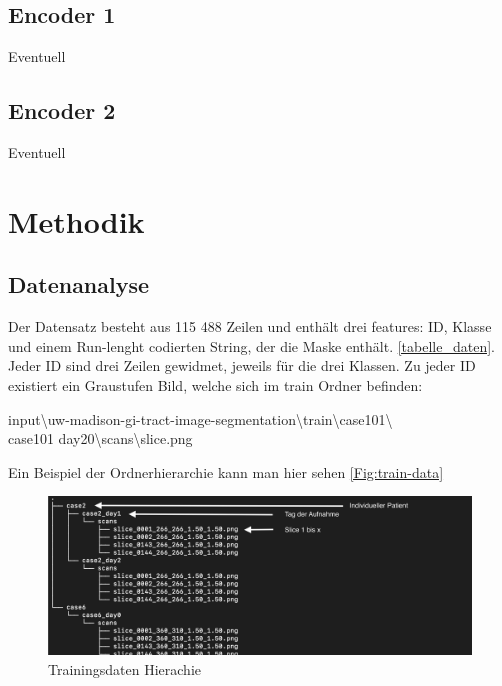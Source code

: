 \subsection{Encoder 1}
Eventuell

\subsection{Encoder 2}
Eventuell


\section{Methodik}\raggedbottom

\subsection{Datenanalyse}
Der Datensatz besteht aus 115 488 Zeilen und enthält drei features: ID, Klasse und einem Run-lenght codierten String, der die Maske enthält. \autoref{tabelle_daten}. Jeder ID sind drei Zeilen gewidmet, jeweils für die drei Klassen. Zu jeder ID existiert ein Graustufen Bild, welche sich im train Ordner befinden:

input\textbackslash uw-madison-gi-tract-image-segmentation\textbackslash train\textbackslash case101\textbackslash \\case101\textunderscore
day20\textbackslash scans\textbackslash slice.png

Ein Beispiel der Ordnerhierarchie kann man hier sehen \autoref{Fig:train-data}

\begin{figure}[htb]
	\begin{center}
		\includegraphics[width=450pt]{bilder/data_tree}
		\caption{Trainingsdaten Hierachie}\label{Fig:train-data}
	\end{center}
\end{figure}

